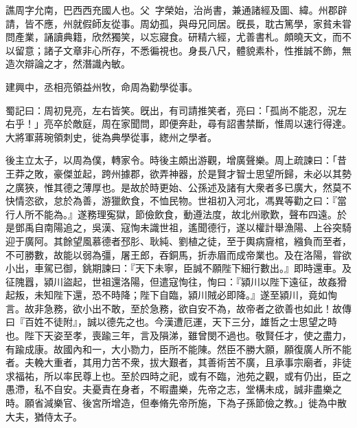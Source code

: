 
\begin{pinyinscope}
譙周字允南，巴西西充國人也。父򠐃，字榮始，治尚書，兼通諸經及圖、緯。州郡辟請，皆不應，州就假師友從事。周幼孤，與母兄同居。旣長，耽古篤學，家貧未甞問產業，誦讀典籍，欣然獨笑，以忘寢食。研精六經，尤善書札。頗曉天文，而不以留意；諸子文章非心所存，不悉徧視也。身長八尺，體貌素朴，性推誠不飾，無造次辯論之才，然潛識內敏。

建興中，丞相亮領益州牧，命周為勸學從事。

蜀記曰：周初見亮，左右皆笑。旣出，有司請推笑者，亮曰：「孤尚不能忍，況左右乎！」亮卒於敵庭，周在家聞問，即便奔赴，尋有詔書禁斷，惟周以速行得達。大將軍蔣琬領刺史，徙為典學從事，緫州之學者。

後主立太子，以周為僕，轉家令。時後主頗出游觀，增廣聲樂。周上疏諫曰：「昔王莽之敗，豪傑並起，跨州據郡，欲弄神器，於是賢才智士思望所歸，未必以其勢之廣狹，惟其德之薄厚也。是故於時更始、公孫述及諸有大衆者多已廣大，然莫不快情恣欲，怠於為善，游獵飲食，不恤民物。世祖初入河北，馮異等勸之曰：『當行人所不能為。』遂務理寃獄，節儉飲食，動遵法度，故北州歌歎，聲布四遠。於是鄧禹自南陽追之，吳漢、寇恂未識世祖，遙聞德行，遂以權計舉漁陽、上谷突騎迎于廣阿。其餘望風慕德者邳肜、耿純、劉植之徒，至于輿病齎棺，繈負而至者，不可勝數，故能以弱為彊，屠王郎，吞銅馬，折赤眉而成帝業也。及在洛陽，甞欲小出，車駕已御，銚期諫曰：『天下未寧，臣誠不願陛下細行數出。』即時還車。及征隗囂，潁川盜起，世祖還洛陽，但遣寇恂往，恂曰：『潁川以陛下遠征，故姦猾起叛，未知陛下還，恐不時降；陛下自臨，潁川賊必即降。』遂至潁川，竟如恂言。故非急務，欲小出不敢，至於急務，欲自安不為，故帝者之欲善也如此！故傳曰『百姓不徒附』，誠以德先之也。今漢遭厄運，天下三分，雄哲之士思望之時也。陛下天姿至孝，喪踰三年，言及隕涕，雖曾閔不過也。敬賢任才，使之盡力，有踰成康。故國內和一，大小勠力，臣所不能陳。然臣不勝大願，願復廣人所不能者。夫輓大重者，其用力苦不衆，拔大艱者，其善術苦不廣，且承事宗廟者，非徒求福祐，所以率民尊上也。至於四時之祀，或有不臨，池苑之觀，或有仍出，臣之愚滯，私不自安。夫憂責在身者，不暇盡樂，先帝之志，堂構未成，誠非盡樂之時。願省減樂官、後宮所增造，但奉脩先帝所施，下為子孫節儉之教。」徙為中散大夫，猶侍太子。


\end{pinyinscope}
